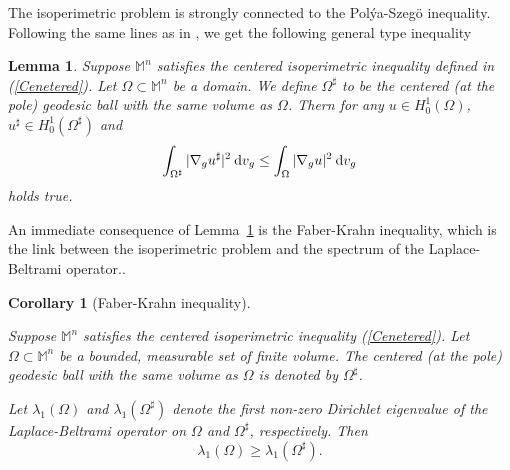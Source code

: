 \documentclass[a4paper,11pt,reqno]{amsart}
\renewcommand\eqref[1]{(\ref{#1})}
\theoremstyle{plain}
\newtheorem{lemma}{Lemma}[section]
\newtheorem{corollary}{Corollary}[section]
\numberwithin{equation}{section} \allowdisplaybreaks
\newcommand{\dvg}{\: {\rm d}v_{g}}
\newcommand{\gradg}{\nabla_g}
\newcommand{\m}{\mathbb{M}^n}
\begin{document}
The isoperimetric problem is strongly connected to the Pol\'ya-Szeg\"o inequality. Following the same lines as in \cite{MV}, we get the following general type inequality
\begin{lemma}\label{L2 PS general}
   Suppose $\m$ satisfies the centered isoperimetric inequality defined in \eqref{Cenetered}. Let $\Omega\subset\m$ be a domain. We define $\Omega^\sharp$ to be the centered (at the pole) geodesic ball with the same volume as $\Omega$. Thern for any $u\in H^1_0(\Omega)$, $u^\sharp\in H^1_0(\Omega^\sharp)$ and 
   \begin{equation*}
       \int_{\Omega^\sharp} |\gradg u^\sharp|^2\dvg\leq \int_{\Omega} |\gradg u|^2\dvg
   \end{equation*}
   holds true.
\end{lemma}
An immediate consequence of Lemma~\ref {L2 PS general} is the Faber-Krahn inequality, which is the link between the isoperimetric problem and the spectrum of the
Laplace-Beltrami operator..
\begin{corollary}[Faber-Krahn inequality]\label{FK inequality}

    Suppose $\m$ satisfies the centered isoperimetric inequality \eqref{Cenetered}. Let $\Omega\subset \m$ be a bounded, measurable set of finite volume. The centered (at the pole) geodesic ball with the same volume as $\Omega$ is denoted by $\Omega^\sharp$. 

    Let $\lambda_1(\Omega)$ and $\lambda_1(\Omega^\sharp)$ denote the first non-zero Dirichlet eigenvalue of the Laplace-Beltrami operator on $\Omega$ and $\Omega^\sharp$, respectively. Then
    \begin{equation*}
        \lambda_1(\Omega) \geq \lambda_1(\Omega^\sharp).
    \end{equation*}
\end{corollary}

\medskip 

\end{document}
